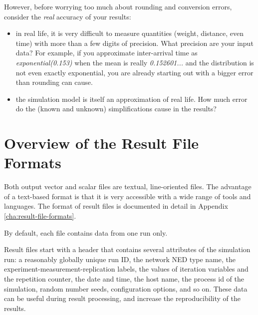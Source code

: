 However, before worrying too much about rounding and conversion errors,
consider the \textit{real} accuracy of your results:

\begin{itemize}
  \item{in real life, it is very difficult to measure quantities (weight, distance,
     even time) with more than a few digits of precision. What precision
     are your input data? For example, if you approximate inter-arrival
     time as \textit{exponential(0.153)} when the mean is really
     \textit{0.152601...} and the distribution is not even exactly exponential,
     you are already starting out with a bigger error than rounding can cause.}

  \item{the simulation model is itself an approximation of real life. How much
     error do the (known and unknown) simplifications cause in the results?}
\end{itemize}



\section{Overview of the Result File Formats}

Both output vector and scalar files are textual, line-oriented files.
The advantage of a text-based format is that it is very accessible
with a wide range of tools and languages. The format of result files is
documented in detail in Appendix \ref{cha:result-file-formats}.


By default, each file contains data from one run only.

Result files start with a header that contains several attributes of the
simulation run: a reasonably globally unique run ID, the network NED type
name, the experiment-measurement-replication labels, the values of
iteration variables and the repetition counter, the date and time, the host
name, the process id of the simulation, random number seeds, configuration
options, and so on. These data can be useful during result processing, and
increase the reproducibility of the results.

